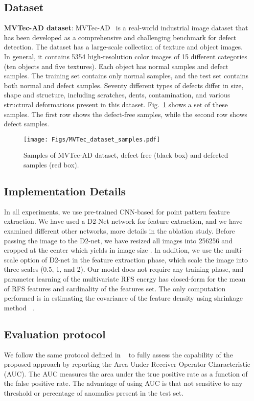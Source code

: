 \documentclass[journal]{IEEEtran}
\let\MYoriglatexcaption\caption
\renewcommand{\caption}[2][\relax]{\MYoriglatexcaption[#2]{#2}}
\begin{document}
\subsection{Dataset}
\textbf{MVTec-AD dataset}:
MVTec-AD~\cite{bergmann2019mvtec} is a real-world industrial image dataset that has been developed as a comprehensive and challenging benchmark for defect detection. The dataset has a large-scale collection of texture and object images. In general, it contains 5354 high-resolution color images of 15 different categories (ten objects and five textures). Each object has normal samples and defect samples. The training set contains only normal samples, and the test set contains both normal and defect samples. Seventy different types of defects differ in size, shape and structure, including scratches, dents, contamination, and various structural deformations present in this dataset.
Fig.~\ref{Mvtec} shows a set of these samples. The first row shows the defect-free samples, while the second row shows defect samples.
\begin{figure}[ht!]
	\texttt{[image: Figs/MVTec\_dataset\_samples.pdf]}
	\caption{Samples of MVTec-AD dataset, defect free (black box) and defected samples (red box).}
	\label{Mvtec}
\end{figure}

\subsection{Implementation Details}

In all experiments, we use pre-trained CNN-based for point pattern feature extraction. We have used a D2-Net network for feature extraction, and we have examined different other networks, more details in the ablation study. Before passing the image to the D2-net, we have resized all images into 256256 and cropped at the center which yields in image size . In addition, we use the multi-scale option of D2-net in the feature extraction phase, which scale the image into three scales (0.5, 1, and 2). Our model does not require any training phase, and parameter learning of the multivariate RFS energy has closed-form for the mean of RFS features and cardinality of the features set. The only computation performed is in estimating the covariance of the feature density using shrinkage method ~\cite{ledoit2004well}.
\subsection{Evaluation protocol}
We follow the same protocol defined in ~\cite{rudolph2021same,ganomaly,rippel2021modeling} to fully assess the capability of the proposed approach by reporting the Area Under Receiver Operator Characteristic (AUC). The AUC measures the area under the true positive rate as a function of the false positive rate. The advantage of using AUC is that not sensitive to any threshold or percentage of anomalies present in the test set.
\end{document}
